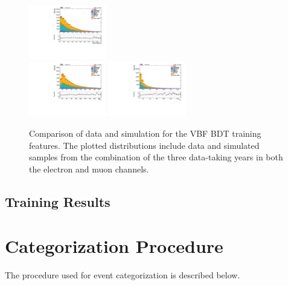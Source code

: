 \begin{figure}[tb]
\begin{center}
		\includegraphics[width=0.3\textwidth]{fig/MVA/sc_all_VBF_sysbal_valid_ptwei_VBF_cat0.pdf}\\ 
		\includegraphics[width=0.3\textwidth]{fig/MVA/sc_all_VBF_VBFPt1_valid_ptwei_VBF_cat0.pdf}
		\includegraphics[width=0.3\textwidth]{fig/MVA/sc_all_VBF_VBFPt2_valid_ptwei_VBF_cat0.pdf}
		\end{center}
	\caption{Comparison of data and simulation for the VBF BDT training features. The plotted distributions include data and simulated samples from the combination of the three 
	data-taking years in both the electron and muon channels.}
	\label{fig:VBF_valid}
\end{figure}

\subsection{Training Results}

\section{Categorization Procedure}

The procedure used for event categorization is described below. 


